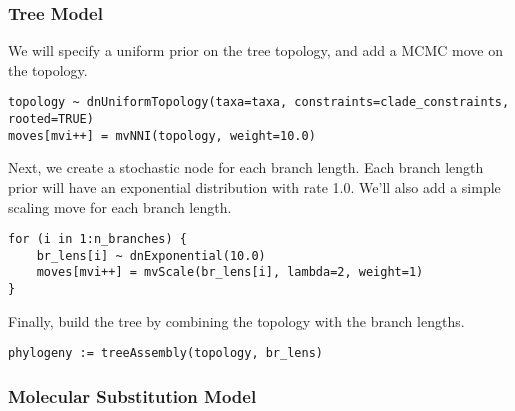 \subsubsection{Tree Model}

We will specify a uniform prior on the tree topology, and add
a MCMC move on the topology.
{\tt \begin{snugshade*}
\begin{lstlisting}
topology ~ dnUniformTopology(taxa=taxa, constraints=clade_constraints, rooted=TRUE)
moves[mvi++] = mvNNI(topology, weight=10.0)
\end{lstlisting}
\end{snugshade*}}
Next, we create a stochastic node for each branch length.
Each branch length prior will have an exponential distribution with rate 1.0.
We'll also add a simple scaling move for each branch length.
{\tt \begin{snugshade*}
\begin{lstlisting}
for (i in 1:n_branches) {
    br_lens[i] ~ dnExponential(10.0)
    moves[mvi++] = mvScale(br_lens[i], lambda=2, weight=1)
}
\end{lstlisting}
\end{snugshade*}}
Finally, build the tree by combining the topology with the branch lengths.
{\tt \begin{snugshade*}
\begin{lstlisting}
phylogeny := treeAssembly(topology, br_lens)
\end{lstlisting}
\end{snugshade*}}

\subsubsection{Molecular Substitution Model}

